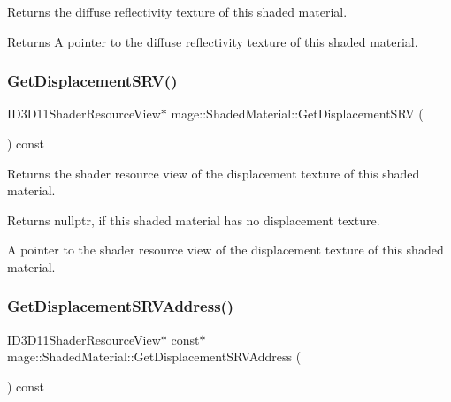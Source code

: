 Returns the diffuse reflectivity texture of this shaded material.

\begin{DoxyReturn}{Returns}
A pointer to the diffuse reflectivity texture of this shaded material. 
\end{DoxyReturn}
\hypertarget{structmage_1_1_shaded_material_ac33beb240df46ad6295425851cafc996}{}\label{structmage_1_1_shaded_material_ac33beb240df46ad6295425851cafc996} 
\subsubsection{\texorpdfstring{Get\+Displacement\+S\+R\+V()}{GetDisplacementSRV()}}
{\footnotesize\ttfamily I\+D3\+D11\+Shader\+Resource\+View$\ast$ mage\+::\+Shaded\+Material\+::\+Get\+Displacement\+S\+RV (\begin{DoxyParamCaption}{ }\end{DoxyParamCaption}) const\hspace{0.3cm}{\ttfamily [noexcept]}}

Returns the shader resource view of the displacement texture of this shaded material.

\begin{DoxyReturn}{Returns}
{\ttfamily nullptr}, if this shaded material has no displacement texture. 

A pointer to the shader resource view of the displacement texture of this shaded material. 
\end{DoxyReturn}
\hypertarget{structmage_1_1_shaded_material_afc31aec2b4532b196306db049c3dddf6}{}\label{structmage_1_1_shaded_material_afc31aec2b4532b196306db049c3dddf6} 
\subsubsection{\texorpdfstring{Get\+Displacement\+S\+R\+V\+Address()}{GetDisplacementSRVAddress()}}
{\footnotesize\ttfamily I\+D3\+D11\+Shader\+Resource\+View$\ast$ const$\ast$ mage\+::\+Shaded\+Material\+::\+Get\+Displacement\+S\+R\+V\+Address (\begin{DoxyParamCaption}{ }\end{DoxyParamCaption}) const\hspace{0.3cm}{\ttfamily [noexcept]}}

